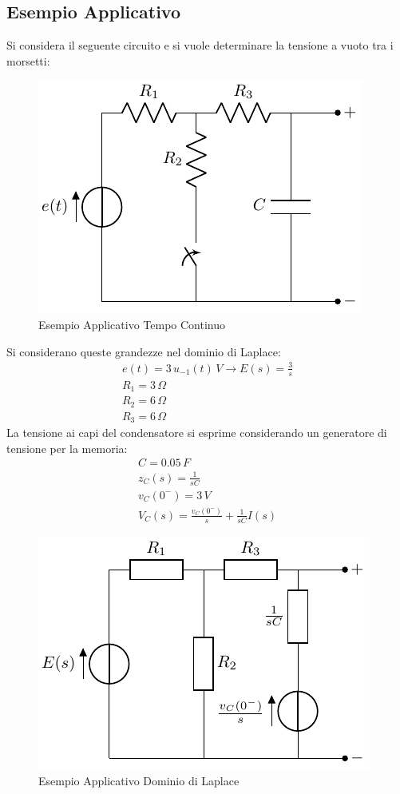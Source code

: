 \documentclass{article}
\numberwithin{equation}{subsection}
\begin{document}
\subsection{Esempio Applicativo}

Si considera il seguente circuito e si vuole determinare la tensione a vuoto tra i morsetti: 
\begin{figure}[ht]%
    \centering
    \includegraphics{esempio-circuito-1.pdf}
    \caption{Esempio Applicativo Tempo Continuo}
    \label{fig:esempio-circuito-1}
\end{figure}
Si considerano queste grandezze nel dominio di Laplace:
\begin{gather*}
    e(t)=3\,u_{-1}(t)\,V\to E(s)=\displaystyle\frac{3}{s}\\
    R_1=3\,\Omega\\
    R_2=6\,\Omega\\
    R_3=6\,\Omega
\end{gather*}
La tensione ai capi del condensatore si esprime considerando un generatore di tensione per la memoria:
\begin{gather*}
    C=0.05\,F\\
    z_C(s)=\displaystyle\frac{1}{sC}\\
    v_C(0^-)=3\,V\\
    V_C(s)=\displaystyle\frac{v_C(0^-)}{s}+\frac{1}{sC}I(s)
\end{gather*}
\begin{figure}[ht]%
    \centering
    \includegraphics{esempio-circuito-1-laplace.pdf}
    \caption{Esempio Applicativo Dominio di Laplace}
    \label{fig:esempio-circuito-1-laplace}
\end{figure}
\end{document}
